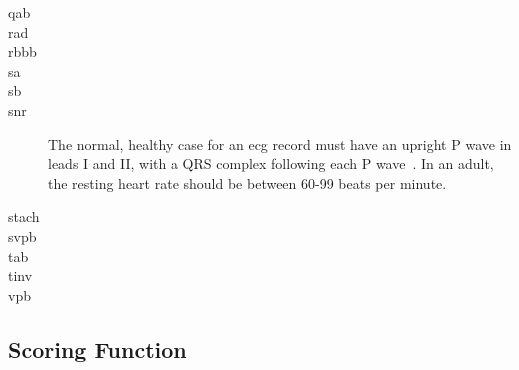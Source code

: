 \documentclass[\main/thesis.tex]{subfiles}
\begin{document}
\begin{description}
    \item[\gls{qab}]
    \item[\gls{rad}]
    \item[\gls{rbbb}]
    \item[\gls{sa}]
    \item[\gls{sb}]
    \item[\gls{snr}] The normal, healthy case for an \gls{ecg} record must have an upright P wave in leads I and II, with a QRS complex following each P wave~\cite{meek_introduction_2002}. In an adult, the resting heart rate should be between 60-99 beats per minute.
    \item[\gls{stach}]
    \item[\gls{svpb}]
    \item[\gls{tab}]
    \item[\gls{tinv}]
    \item[\gls{vpb}]
\end{description}

\subsection{Scoring Function}


\end{document}
